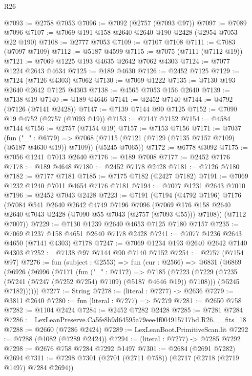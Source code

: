 \begin{lexlean}{R26}
\begin{coremodule}
@7093 := @2758 @7053
@7096 := @7092 (@2757 (@7093 @97))
@7097 := @7089 @7096
@7107 := @7069 @191 @158 @2640 @2640 @190 @2428 (@2954 @7053 @22 @190)
@7108 := @2777 @7053
@7109 := @7107 @7108
@7111 := @7083 (@7097 @7109)
@7112 := @5187 @4599
@7115 := @7075 (@7111 (@7112 @19))
@7121 := @7069 @1225 @193 @4635 @2642 @7062 @4303
@7124 := @7077 @1224 @2643 @4634
@7125 := @189 @4630
@7126 := @2452 @7125
@7129 := @7124 (@7126 @4303) @7062
@7130 := @7069 @1222
@7135 := @7130 @193 @2640 @2642 @7125 @4303
@7138 := @4565 @7053 @156 @2640
@7139 := @7138 @19
@7140 := @189 @4646
@7141 := @2452 @7140
@7144 := @4792 (@7126 (@7141 @2428))
@7147 := @7139 @7144 @90 @7125
@7152 := @7090 @19 @4752 (@2757 (@7093 @19))
@7153 := @7147 @7152
@7154 := @4584 @7144
@7156 := @2757 (@7154 @19)
@7157 := @7153 @7156
@7171 := @7037
    (fun ("_" : @6779) =>
    @7068 (@7115 (@7121 (@7129 (@7135 @7157 @7109) (@5187 @4630 @19)) @7109)) (@5245 @7065))
@7172 := @6778 @3092
@7175 := @7056 @1241 @7013 @2640
@7176 := @189 @7008
@7177 := @2452 @7176
@7178 := @189 @4648
@7180 := @2452 @7178 @2428
@7181 := @7126 @7180
@7182 := @7177 @7181
@7185 := @7175 @7182 (@2427 @7182)
@7191 := @7069 @1232 @1240 @7011 @4654 @7176 @7181
@7194 := @7077 @1231 @2643 @7010
@7196 := @2452 @7043 @2428
@7223 := @7191
    (@7194
      (@4792 @7196)
      @7176
      (@7084
        @541
        @2640
        @2642
        @4749
        @7196
        @7096
        (@7069 @176 @158 @2640 @2640 @7043 @2428 (@7090 @55 @7043 (@2757 (@7093 @55))) @7108))
      (@7112 @7007))
@7229 := @7130 @1239 @2640 @4653 @7125 @7180 @7157
@7235 := @7069 @1237 @158 @4651 @2640 @7178 @2428
@7241 := @7077 @1236 @2643 @4650 (@7141 @4303) @7178
@7247 := @7069 @1234 @193 @2640 @2642 @7140 @4303
@7252 := @7138 @97 @7144 @90 @7140 @7152
@7254 := @2757 (@7154 @97)
@7276 := fun (subject : @2553) =>
  fun (cur : @2566) =>
  @6831
    (@6869
      (@6926
        (@6996
          (@7171
            (fun ("_" : @7172) =>
            @7185
              (@7223 (@7229 (@7235 (@7241 (@7247 (@7252 @7254) @7109) (@5187 @4646 @19)) @7108)))
              (@5245 @7182))))))
@7277 := String
@7278 := (literal : @7277) -> @2636
@7279 := @3811 @2640
@7280 := fun (literal : @7277) => @7279
@7281 := @2650 @758
@7282 := @1104 @2424
@7284 := @2452 @7282 @2428
@7285 := @7281 @7284
@7286 := LexLeanPreserve.Ca5fe8b9d64595a79eee4f004915717bd.R26.__fits_18
@7288 := @2660 (@7286 @2424)
@7289 := LexLeanBoot.PrimitiveScan.lit
@7292 := @7288 (@1082 (@7289 @2424))
@7294 := (literal : @7277) -> @7285 @7292
@7298 := @2676 @758 @7284 @7292 @1497
@7301 := @2684 (@2691 @7282) @2694
@7311 := @7298 @7301 (@2701 (@2711 @758)) (@2717 (@2718 (@2719 @1497) @7284 @2694))

\end{coremodule}
\end{lexlean}

